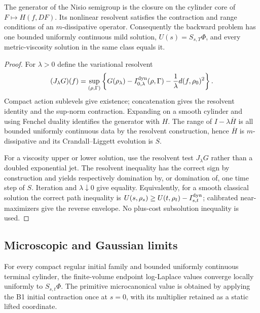 \begin{theorem}
\label{thm:r13-b4-comparison}
The generator of the Nisio semigroup is the closure on the cylinder core of
$F\mapsto H(f,DF)$.  Its nonlinear resolvent satisfies the contraction and
range conditions of an $m$-dissipative operator.  Consequently the backward
problem has one bounded uniformly continuous mild solution,
$U(s)=S_{s,T}\Phi$, and every metric-viscosity solution in the same class
equals it.
\end{theorem}

\begin{proof}
For $\lambda>0$ define the variational resolvent
\[
 (J_\lambda G)(f)=
 \sup_{(\rho,\Gamma)}
 \left\{G(\rho_{\lambda})-
 I_{0,\lambda}^{\rm dyn}(\rho,\Gamma)
 -{1\over\lambda}
  d(f,\rho_0)^2\right\}.
\]
Compact action sublevels give existence; concatenation gives the resolvent
identity and the sup-norm contraction.  Expanding on a smooth cylinder and
using Fenchel duality identifies the generator with $H$.  The range of
$I-\lambda\overline H$ is all bounded uniformly continuous data by the
resolvent construction, hence $\overline H$ is $m$-dissipative and its
Crandall--Liggett evolution is $S$.

For a viscosity upper or lower solution, use the resolvent test
$J_\lambda G$ rather than a doubled exponential jet.  The resolvent inequality
has the correct sign by construction and yields respectively domination by,
or domination of, one time step of $S$.  Iteration and
$\lambda\downarrow0$ give equality.  Equivalently, for a smooth classical
solution the correct path inequality is
$U(s,\rho_s)\ge U(t,\rho_t)-I_{s,t}^{\rm dyn}$; calibrated near-maximizers give
the reverse envelope.  No plus-cost subsolution inequality is used.
\end{proof}

\subsection{Microscopic and Gaussian limits}

\begin{theorem}
\label{thm:r13-b4-limit}
For every compact regular initial family and bounded uniformly continuous
terminal cylinder, the finite-volume endpoint log-Laplace values converge
locally uniformly to $S_{s,t}\Phi$.  The primitive microcanonical value is
obtained by applying the B1 initial contraction once at $s=0$, with its
multiplier retained as a static lifted coordinate.
\end{theorem}

